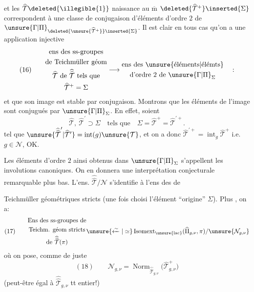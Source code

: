 

et les $\widehat{\mathcal{T}}\deleted{\illegible{1}}$  naissance au $\overline{\mathrm m}$ $\deleted{\widehat{\mathcal{T}}^{+}}\inserted{\Sigma}$ correspondent  à une classe de conjugaison d'éléments d'ordre $2$ de $\unsure{\Gamma|\Pi}_{\deleted{\unsure{\widehat{\mathcal{T}}^{+}}}\inserted{\Sigma}}$. Il est clair  en tous cas qu'on a une application injective
\[
(16)\qquad
\begin{gathered}
\text{ens des ss-groupes}\\
\text{de Teichmüller géom}\\
\widehat{\mathcal{T}}\text{ de }\widehat{\widehat{\mathcal{T}}}\text{ tels que}\\
\widehat{\mathcal{T}}^{+}=\Sigma
\end{gathered}
\longrightarrow
\begin{gathered}
\text{ens des }\unsure{\text{éléments}|\text{élémts}}\\
\text{d'ordre }2\text{ de }\unsure{\Gamma|\Pi}_{\Sigma}
\end{gathered}
\quad :
\]
et que son image est stable par conjugaison. Montrons que les éléments de l'image sont conjugués par $\unsure{\Gamma|\Pi}_{\Sigma}$. En effet, soient
\[
\widehat{\mathcal{T}},\ \widehat{\mathcal{T}}^{\prime}\supset\Sigma
\quad\text{tels que}\quad
\Sigma=\widehat{\mathcal{T}}^{+}=\widehat{\mathcal{T}}^{\prime+}.
\]
tel que
$\unsure{\widehat{\widehat{\mathcal{T}}}^{\prime}|\widehat{\mathcal{T}}^{\prime}}=\operatorname{int}(g)\unsure{\mathcal{T}}$,
et on a donc
$\widehat{\mathcal{T}}^{\prime+}=\operatorname{int}_{g}\widehat{\mathcal{T}}^{+}$
i.e. $g\in\mathcal{N}$, OK.

Les éléments d'ordre $2$ ainsi obtenus dans $\unsure{\Gamma|\Pi}_{\Sigma}$ s'appellent les involutions canoniques. On en donnera une interprétation conjecturale remarquable plus bas. L'ens. $\widehat{\widehat{\mathcal{T}}}/\mathcal{N}$ s'identifie à l'ens des  de



Teichmüller géométriques stricts (une fois choisi l'élément ``origine'' $\Sigma$). Plus , on a:
\[
(17)\qquad
\begin{gathered}
\text{Ens des ss-groupes de}\\
\text{Teichm. géom stricts}\\
\text{de }\widehat{\widehat{\mathcal{T}}}(\pi)
\end{gathered}
\unsure{\xleftarrow{\sim}|\simeq}
\operatorname{Isomext}_{\unsure{\mathrm{lac}}}
(\widehat{\Pi}_{g,\nu},\pi)/\unsure{\mathcal{N}_{g,\nu}} 
\]
où on pose, comme de juste
\[
(18)\qquad
\mathcal{N}_{g,\nu}
=\operatorname{Norm}_{\widehat{\widehat{\mathcal{T}}}_{g,\nu}}
\bigl(\widehat{\mathcal{T}}_{g,\nu}^{+}\bigr)
\]
(peut-être égal à $\widehat{\widehat{\mathcal{T}}}_{g,\nu}$ tt entier!)

